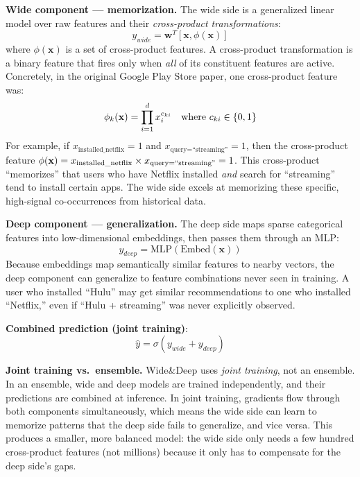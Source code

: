 \textbf{Wide component --- memorization.} The wide side is a generalized linear model over raw features and their \textit{cross-product transformations}:
\begin{equation}
y_{wide} = \mathbf{w}^T[\mathbf{x}, \phi(\mathbf{x})]
\end{equation}
where $\phi(\mathbf{x})$ is a set of cross-product features. A cross-product transformation is a binary feature that fires only when \textit{all} of its constituent features are active. Concretely, in the original Google Play Store paper, one cross-product feature was:
\[
\phi_k(\mathbf{x}) = \prod_{i=1}^{d} x_i^{c_{ki}} \quad \text{where } c_{ki} \in \{0,1\}
\]
For example, if $x_{\text{installed\_netflix}} = 1$ and $x_{\text{query=``streaming''}} = 1$, then the cross-product feature $\phi(\mathbf{x}) = x_{\text{installed\_netflix}} \times x_{\text{query=``streaming''}} = 1$. This cross-product ``memorizes'' that users who have Netflix installed \textit{and} search for ``streaming'' tend to install certain apps. The wide side excels at memorizing these specific, high-signal co-occurrences from historical data.

\textbf{Deep component --- generalization.} The deep side maps sparse categorical features into low-dimensional embeddings, then passes them through an MLP:
\begin{equation}
y_{deep} = \text{MLP}(\text{Embed}(\mathbf{x}))
\end{equation}
Because embeddings map semantically similar features to nearby vectors, the deep component can generalize to feature combinations never seen in training. A user who installed ``Hulu'' may get similar recommendations to one who installed ``Netflix,'' even if ``Hulu + streaming'' was never explicitly observed.

\textbf{Combined prediction (joint training)}:
\begin{equation}
\hat{y} = \sigma(y_{wide} + y_{deep})
\end{equation}

\textbf{Joint training vs.\ ensemble.} Wide\&Deep uses \textit{joint training}, not an ensemble. In an ensemble, wide and deep models are trained independently, and their predictions are combined at inference. In joint training, gradients flow through both components simultaneously, which means the wide side can learn to memorize patterns that the deep side fails to generalize, and vice versa. This produces a smaller, more balanced model: the wide side only needs a few hundred cross-product features (not millions) because it only has to compensate for the deep side's gaps.

